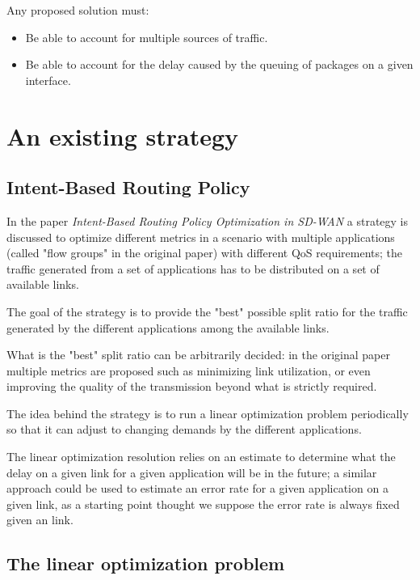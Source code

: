 	Any proposed solution must: 
	
	\begin{itemize}
		\item Be able to account for multiple sources of traffic.
		\item Be able to account for the delay caused by the queuing of packages on a given interface.
	\end{itemize}
	
	
	
	\section{An existing strategy}
	
	
	\subsection{Intent-Based Routing Policy}
	

	In the paper \textit{Intent-Based Routing Policy Optimization in SD-WAN} \cite{intent_based_routing} a strategy is discussed to optimize different metrics in a scenario with multiple applications (called "flow groups" in the original paper) with different QoS requirements; the traffic generated from a set of applications has to be distributed on a set of available links.
	
	The goal of the strategy is to provide the "best" possible split ratio for the traffic generated by the different applications among the available links.
	
	What is the "best" split ratio can be arbitrarily decided: in the original paper multiple metrics are proposed such as minimizing link utilization, or even improving the quality of the transmission beyond what is strictly required.
	
	The idea behind the strategy is to run a linear optimization problem periodically so that it can adjust to changing demands by the different applications.
	
	The linear optimization resolution relies on an estimate to determine what the delay on a given link for a given application will be in the future; a similar approach could be used to estimate an error rate for a given application on a given link, as a starting point thought we suppose the error rate is always fixed given an link.
	
	
	\subsection{The linear optimization problem}
	
